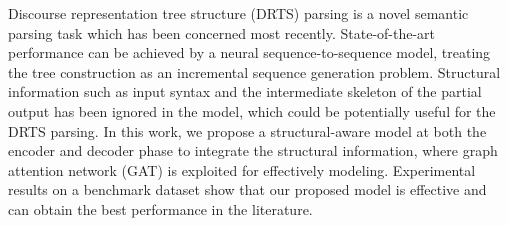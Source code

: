 Discourse representation tree structure (DRTS) parsing is a novel semantic parsing task which has been concerned most recently. State-of-the-art performance can be achieved by a neural sequence-to-sequence model, treating the tree construction as an incremental sequence generation problem. Structural information such as input syntax and the intermediate skeleton of the partial output has been ignored in the model, which could be potentially useful for the DRTS parsing. In this work, we propose a structural-aware model at both the encoder and decoder phase to integrate the structural information, where graph attention network (GAT) is exploited for effectively modeling. Experimental results on a benchmark dataset show that our proposed model is effective and can obtain the best performance in the literature.
